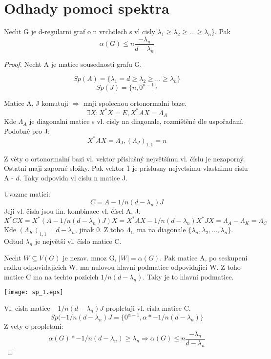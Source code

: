\section{\texorpdfstring{Odhady pomoci spektra}{Odhady pomoci spektra}}
\vspace{5mm}
\large

\begin{theorem}
	Necht G je d-regularni graf o n vrcholech s vl cisly $\lambda_1 \geq \lambda_2 \geq ... \geq \lambda_n \}$. Pak
	\[ \alpha(G) \leq n \frac{-\lambda_n}{d - \lambda_n} \]
\end{theorem}
\begin{proof}
	Necht A je matice sousednosti grafu G.

	\[ Sp(A) = \{\lambda_1 = d \geq \lambda_2 \geq ... \geq \lambda_n \} \]
	\[ Sp(J) = \{n, 0^{n-1} \} \]

	Matice A, J komutuji $\Rightarrow$ maji spolecnou ortonormalni baze.
	\[ \exists X: X^{\ast}X = E, X^{\ast}AX = \Lambda_A \]
	Kde $\Lambda_A$ je diagonalni matice s vl. cisly na diagonale, rozmíštěné dle uspořadaní. Podobně pro J:
	\[ X^{\ast}AX = \Lambda_J, (\Lambda_J)_{1,1} = n \]

	Z věty o ortonormalní bazi vl. vektor přislušný největšímu vl. číslu je nezaporný. Ostatní maji zaporné složky.
	Pak vektor $\bar{1}$ je prislusny nejvetsimu vlastnimu cislu A - $d$.
	Taky odpovida vl cislu n matice J.

 	Uvazme matici:
	\[ C = A - 1/n(d - \lambda_n)J \]
	Jeji vl. čísla jsou lin. kombinace vl. čísel A, J.
	\[ X^{\ast}CX = X^{\ast}(A - 1/n(d - \lambda_n)J)X = X^{\ast}AX - 1/n(d - \lambda_n)X^{\ast}JX = \Lambda_A - \Lambda_K = \Lambda_C \]
	Kde $(\Lambda_K)_{1,1} = d - \lambda_n$, jinak 0. Z toho $\Lambda_C$ ma na diagonale $\{ \lambda_n, \lambda_2,..., \lambda_n \}$.
	Odtud $\lambda_n$ je největší vl. číslo matice C.

	Necht $W \subseteq V(G)$ je nezav. mnoz G, $|W| = \alpha(G)$. Pak matice A, po seskupeni radku odpovidajicich W, ma nulovou hlavni podmatice odpovidajici W.
	Z toho matice C ma na techto pozicich $1/n(d - \lambda_n)$. Taky je to hlavni podmatice.

	\texttt{[image: sp\_1.eps]}

	Vl. cisla matice $-1/n(d - \lambda_n)J$ propletaji vl. cisla matice C.
	\[ Sp(-1/n(d - \lambda_n)J = \{0^{\alpha - 1}, \alpha * -1/n(d - \lambda_n) \} \]
	Z vety o propletani:
	\[ \alpha(G) * -1/n(d - \lambda_n) \geq \lambda_n \Rightarrow \alpha(G) \leq n \frac{-\lambda_n}{d - \lambda_n} \]
\end{proof}

